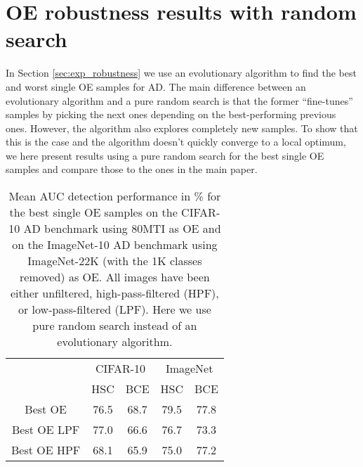 \documentclass[10pt]{article} \usepackage[accepted]{stylefiles/tmlr}
\begin{document}
\section{OE robustness results with random search} \label{appx:rand_search}
In Section \ref{sec:exp_robustness} we use an evolutionary algorithm to find the best and worst single OE samples for AD. 
The main difference between an evolutionary algorithm and a pure random search is that the former ``fine-tunes'' samples by picking the next ones depending on the best-performing previous ones. 
However, the algorithm also explores completely new samples.
To show that this is the case and the algorithm doesn't quickly converge to a local optimum, we here present results using a pure random search for the best single OE samples and compare those to the ones in the main paper. 
\begin{table}[ht]
  \caption{Mean AUC detection performance in \% for the best single OE samples on the CIFAR-10 AD benchmark using 80MTI as OE and on the ImageNet-10 AD benchmark using ImageNet-22K (with the 1K classes removed) as OE. All images have been either unfiltered, high-pass-filtered (HPF), or low-pass-filtered (LPF). Here we use pure random search instead of an evolutionary algorithm. }
  \label{tab:random_oe}
  \begin{center}
    \small
     \begin{tabular}{ccccc} 
\toprule 
& \multicolumn{2}{c|}{CIFAR-10} & \multicolumn{2}{c}{ImageNet} \\ 
& HSC & \multicolumn{1}{c|}{BCE} & HSC & BCE \\ 
\midrule 
Best OE & 76.5 & \multicolumn{1}{c|}{68.7} & 79.5 & 77.8 \\
Best OE LPF & 77.0 & \multicolumn{1}{c|}{66.6} & 76.7 & 73.3 \\ 
Best OE HPF & 68.1& \multicolumn{1}{c|}{65.9} & 75.0 & 77.2 \\ 
\bottomrule 
\end{tabular} 

   \end{center}
\end{table}
\end{document}
